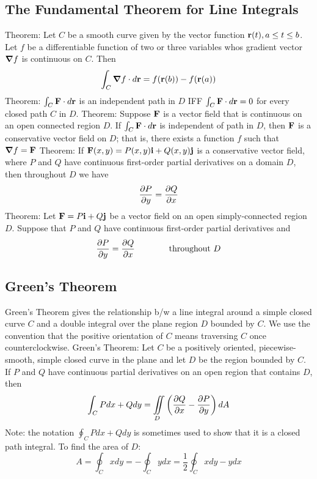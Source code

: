 \documentclass{article}
\begin{document}
    \subsection{The Fundamental Theorem for Line Integrals}
    \begin{outline}
        \1 Theorem: Let $C$ be a smooth curve given by the vector function \(\vb r(t),a\leq t\leq b\). Let $f$ be a differentiable function of two or three variables whos gradient vector \(\grad f\) is continuous on $C$. Then \[\int_C\grad f\cdot d\vb r=f(\vb r(b))-f(\vb r(a))\]
        \1 Theorem: \(\int_C\vb F\cdot d\vb r\) is an independent path in $D$ IFF \(\int_C\vb F\cdot d\vb r=0\) for every closed path $C$ in $D$. 
        \1 Theorem: Suppose \(\vb F\) is a vector field that is continuous on an open connected region $D$. If \(\int_C\vb F\cdot d\vb r\) is independent of path in $D$, then \(\vb F\) is a conservative vector field on $D$; that is, there exists a function $f$ such that \(\grad f=\vb F\)
        \1 Theorem: If \(\vb F(x,y)=P(x,y)\vb i+Q(x,y)\vb j\) is a conservative vector field, where $P$ and $Q$ have continuous first-order partial derivatives on a domain $D$, then throughout $D$ we have \[\pdv{P}{y}=\pdv{Q}{x}\]
        \1 Theorem: Let \(\vb F=P\vb i+Q\vb j\) be a vector field on an open simply-connected region $D$. Suppose that \(P\) and $Q$ have continuous first-order partial derivatives and \[\pdv{P}{y}=\pdv{Q}{x}\qquad\qquad\text{throughout }D\]
    \end{outline}    
    \subsection{Green's Theorem}
    \begin{outline}
        \1 Green's Theorem gives the relationship b/w a line integral around a simple closed curve $C$ and a double integral over the plane region $D$ bounded by $C$. 
        \1 We use the convention that the positive orientation of $C$ means traversing $C$ once counterclockwise. 
        \1 Green's Theorem: Let $C$ be a positively oriented, piecewise-smooth, simple closed curve in the plane and let $D$ be the region bounded by $C$. If $P$ and $Q$ have continuous partial derivatives on an open region that contains $D$, then \[\int_CPdx+Qdy=\iint\limits_D\left(\pdv{Q}{x}-\pdv{P}{y}\right)dA\]
            \2 Note: the notation \(\oint_CPdx+Qdy\) is sometimes used to show that it is a closed path integral. 
        \1 To find the area of $D$: \[A=\oint_Cxdy=-\oint_Cydx=\dfrac{1}{2}\oint_Cxdy-ydx\]

    \end{outline}
\end{document}
